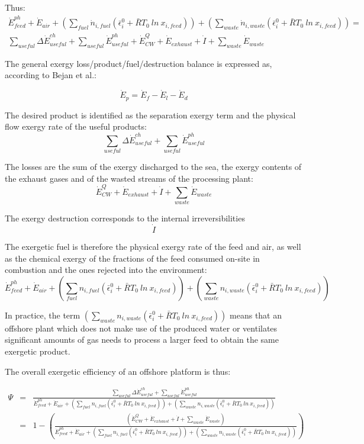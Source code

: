 \documentclass[preprint,times,review,3p]{elsarticle}
\begin{document}
			Thus:
			\begin{eqnarray}
			\dot{E}_{feed}^{ph}+\dot{E}_{air}+\left(\sum_{fuel} \dot{n}_{i,fuel}\left(\bar{\epsilon}^0_i+\bar{R}T_0\ ln\ x_{i,feed}\right)\right)+\left(\sum_{waste}  \dot{n}_{i,waste}\left(\bar{\epsilon}^0_i+\bar{R}T_0\ ln\ x_{i,feed}\right)\right) = \nonumber\\
			\sum_{useful}\Delta \dot{E}^{ch}_{useful}+\sum_{useful} \dot{E}^{ph}_{useful}+\dot{E}^Q_{CW}+\dot{E}_{exhaust}+\dot{I}+\sum_{waste}\dot{E}_{waste}
			\end{eqnarray}
			
			The general exergy loss/product/fuel/destruction balance is expressed as, according to Bejan et al.:
			
			\begin{equation}
			\dot{E}_p=\dot{E}_f-\dot{E}_l-\dot{E}_d
			\end{equation}
			
			The desired product is identified as the separation exergy term and the physical flow exergy rate of the useful products: $$ \sum_{useful}\Delta \dot{E}^{ch}_{useful}+\sum_{useful} \dot{E}^{ph}_{useful} $$
						
			The losses are the sum of the exergy discharged to the sea, the exergy contents of the exhaust gases and of the wasted streams of the processing plant: $$ \dot{E}^Q_{CW}+\dot{E}_{exhaust}+\dot{I}+\sum_{waste}\dot{E}_{waste} $$
			
			The exergy destruction corresponds to the internal irreversibilities $$\dot{I}$$
			
			The exergetic fuel is therefore the physical exergy rate of the feed and air, as well as the chemical exergy of the fractions of the feed consumed on-site in combustion and the ones rejected into the environment: 
			 $$ \dot{E}_{feed}^{ph}+\dot{E}_{air}+\left(\sum_{fuel} n_{i,fuel}\left(\bar{\epsilon}^0_i+\bar{R}T_0\ ln\ x_{i,feed}\right)\right)+\left(\sum_{waste} n_{i,waste}\left(\bar{\epsilon}^0_i+\bar{R}T_0\ ln\ x_{i,feed}\right)\right) $$
			
			In practice, the term $\left(\sum_{waste} n_{i,waste}(\bar{\epsilon}^0_i+\bar{R}T_0\ ln\ x_{i,feed})\right)$ means that an offshore plant which does not make use of the produced water or ventilates significant amounts of gas needs to process a larger feed to obtain the same exergetic product. 
			
			The overall exergetic efficiency of an offshore platform is thus:
			
			\begin{eqnarray}
			\Psi&=&\frac{\sum_{useful}\Delta \dot{E}^{ch}_{useful}+\sum_{useful} \dot{E}^{ph}_{useful}}{\dot{E}_{feed}^{ph}+\dot{E}_{air}+\left(\sum_{fuel} n_{i,fuel}\left(\bar{\epsilon}^0_i+\bar{R}T_0\ ln\ x_{i,feed}\right)\right)+\left(\sum_{waste} n_{i,waste}\left(\bar{\epsilon}^0_i+\bar{R}T_0\ ln\ x_{i,feed}\right)\right)} \\
			&=&1-\left(\frac{\left(\dot{E}^Q_{CW}+\dot{E}_{exhaust}+\dot{I}+\sum_{waste}\dot{E}_{waste}\right)}{\dot{E}_{feed}^{ph}+\dot{E}_{air}+\left(\sum_{fuel} n_{i,fuel}\left(\bar{\epsilon}^0_i+\bar{R}T_0\ ln\ x_{i,feed}\right)\right)+\left(\sum_{waste} n_{i,waste}\left(\bar{\epsilon}^0_i+\bar{R}T_0\ ln\ x_{i,feed}\right)\right)}\right)
			\end{eqnarray}
\end{document}
